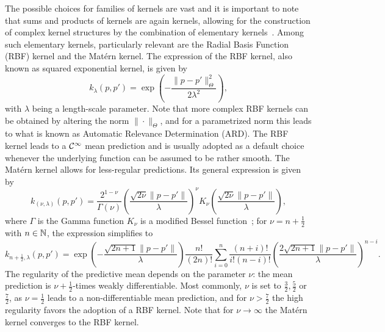 The possible choices for families of kernels are vast and it is important to note that sums and products of kernels are again kernels, allowing for the construction of complex kernel structures by the combination of elementary kernels~\cite{Duvenaud}.
Among such elementary kernels, particularly relevant are the Radial Basis Function (RBF) kernel and the Matérn kernel. \newline
The expression of the RBF kernel, also known as squared exponential kernel, is given by
\[
k_{\lambda}(p, p') = \exp\left(-\frac{\|p - p'\|_\Theta^2}{2\lambda^2}\right),
\]
with $\lambda$ being a length-scale parameter. 
Note that more complex RBF kernels can be obtained by altering the norm $\| \cdot \|_\Theta$, and for a parametrized norm this leads to what is known as Automatic Relevance Determination (ARD).
The RBF kernel leads to a $\mathcal C^\infty$ mean prediction and is usually adopted as a default choice whenever the underlying function can be assumed to be rather smooth. \newline
The Matérn kernel allows for less-regular predictions. Its general expression is given by
\[
k_{(\nu, \lambda)}(p, p') = \frac{2^{1-\nu}}{\Gamma(\nu)} \left( \frac{\sqrt{2\nu} \|p - p'\|}{\lambda} \right)^\nu K_\nu \left( \frac{\sqrt{2\nu} \|p - p'\|}{\lambda} \right),
\]
where $\Gamma$ is the Gamma function $K_\nu$ is a modified Bessel function~\cite[sec. 9.6]{AbramowitzStegun1964};
for $\nu = n + \frac{1}{2}$ with $n\in \mathbb N$, the expression simplifies to 
\[
     k_{n+\frac{1}{2}, \lambda}(p, p')=\exp \left(-{\frac {{\sqrt {2n+1}}\|p - p'\|}{\lambda }}\right){\frac {n!}{(2n)!}}\sum _{i=0}^{n}{\frac {(n+i)!}{i!(n-i)!}}\left({\frac {2{\sqrt {2n+1}}\|p - p'\|}{\lambda }}\right)^{n-i}.
\]
The regularity of the predictive mean depends on the parameter $\nu$: the mean prediction is $\nu + \frac{1}{2}$-times weakly differentiable.
Most commonly, $\nu$ is set to $\frac{3}{2}, \frac{5}{2}$ or $\frac{7}{2}$, as $\nu = \frac{1}{2}$ leads to a non-differentiable mean prediction, and for $\nu > \frac{7}{2}$ the high regularity favors the adoption of a RBF kernel.
Note that for $\nu \rightarrow \infty$ the Matérn kernel converges to the RBF kernel. \medbreak


